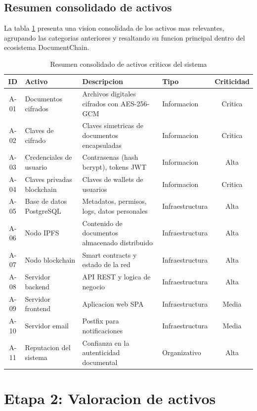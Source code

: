 \documentclass[11pt, a4paper]{article}
\begin{document}
\subsection{Resumen consolidado de activos}

La tabla \ref{tab:activos} presenta una vision consolidada de los activos mas relevantes, agrupando las categorias anteriores y resaltando su funcion principal dentro del ecosistema DocumentChain.

\begin{table}[H]
\centering
\renewcommand{\arraystretch}{1.4}
\small
\begin{tabular}{|c|l|p{5cm}|l|c|}
\hline
\textbf{ID} & \textbf{Activo} & \textbf{Descripcion} & \textbf{Tipo} & \textbf{Criticidad} \\
\hline
A-01 & Documentos cifrados & Archivos digitales cifrados con AES-256-GCM & Informacion & Critica \\
\hline
A-02 & Claves de cifrado & Claves simetricas de documentos encapsuladas & Informacion & Critica \\
\hline
A-03 & Credenciales de usuario & Contrasenas (hash bcrypt), tokens JWT & Informacion & Alta \\
\hline
A-04 & Claves privadas blockchain & Claves de wallets de usuarios & Informacion & Critica \\
\hline
A-05 & Base de datos PostgreSQL & Metadatos, permisos, logs, datos personales & Infraestructura & Alta \\
\hline
A-06 & Nodo IPFS & Contenido de documentos almacenado distribuido & Infraestructura & Alta \\
\hline
A-07 & Nodo blockchain & Smart contracts y estado de la red & Infraestructura & Alta \\
\hline
A-08 & Servidor backend & API REST y logica de negocio & Infraestructura & Alta \\
\hline
A-09 & Servidor frontend & Aplicacion web SPA & Infraestructura & Media \\
\hline
A-10 & Servidor email & Postfix para notificaciones & Infraestructura & Media \\
\hline
A-11 & Reputacion del sistema & Confianza en la autenticidad documental & Organizativo & Alta \\
\hline
\end{tabular}
\caption{Resumen consolidado de activos criticos del sistema}
\label{tab:activos}
\end{table}

\section{Etapa 2: Valoracion de activos}
\end{document}
